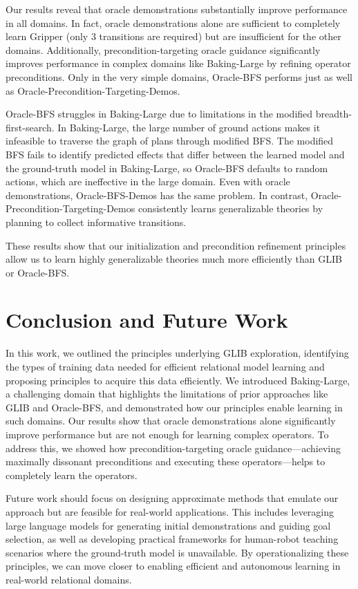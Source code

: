 Our results reveal that oracle demonstrations substantially improve performance in all domains. In fact, oracle demonstrations alone are sufficient to completely learn  Gripper (only 3 transitions are required) but are insufficient for the other domains.
Additionally, precondition-targeting oracle guidance significantly improves performance in complex domains like Baking-Large by refining operator preconditions. Only in the very simple domains, Oracle-BFS performs just as well as Oracle-Precondition-Targeting-Demos.

Oracle-BFS struggles in Baking-Large due to limitations in the modified breadth-first-search. In Baking-Large, the large number of ground actions makes it infeasible to traverse the graph of plans through modified BFS. The modified BFS fails to identify predicted effects that differ between the learned model and the ground-truth model in Baking-Large, so Oracle-BFS defaults to random actions, which are ineffective in the large domain. Even with oracle demonstrations, Oracle-BFS-Demos has the same problem. In contrast, Oracle-Precondition-Targeting-Demos consistently learns generalizable theories by planning to collect informative transitions.

These results show that our initialization and precondition refinement principles allow us to learn highly generalizable theories much more efficiently than GLIB or Oracle-BFS.

\section{Conclusion and Future Work}
In this work, we outlined the principles underlying GLIB exploration, identifying the types of training data needed for efficient relational model learning and proposing principles to acquire this data efficiently. We introduced Baking-Large, a challenging domain that highlights the limitations of prior approaches like GLIB and Oracle-BFS, and demonstrated how our principles enable learning in such domains.
Our results show that oracle demonstrations alone significantly improve performance but are not enough for learning complex operators. To address this, we showed how precondition-targeting oracle guidance---achieving maximally dissonant preconditions and executing these operators---helps to completely learn the operators.

Future work should focus on designing approximate methods that emulate our approach but are feasible for real-world applications. This includes leveraging large language models for generating initial demonstrations and guiding goal selection, as well as developing practical frameworks for human-robot teaching scenarios where the ground-truth model is unavailable. By operationalizing these principles, we can move closer to enabling efficient and autonomous learning in real-world relational domains.


 